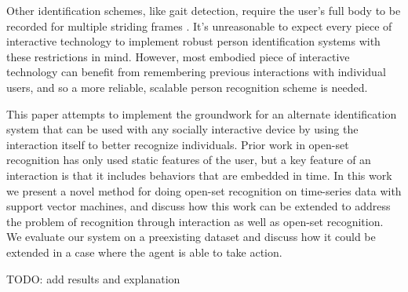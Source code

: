 \documentclass[conference]{IEEEtran}
\newcommand{\elaine}[1]{{\textcolor[rgb]{0.1,0.4,0.6}{[ESS: {\it #1}]}}}
\begin{document}
Other identification schemes, like gait detection, require the user's full body to be recorded for multiple striding frames \cite{liang_wang_silhouette_2003}\cite{han_individual_2006}. It's unreasonable to expect every piece of interactive technology to implement robust person identification systems with these restrictions in mind. However, most embodied piece of interactive technology can benefit from remembering previous interactions with individual users, and so a more reliable, scalable person recognition scheme is needed. 

This paper attempts to implement the groundwork for an alternate identification system that can be used with any socially interactive device by using the interaction itself to better recognize individuals. Prior work in open-set recognition has only used static features of the user, but a key feature of an interaction is that it includes behaviors that are embedded in time. In this work we present a novel method for doing open-set recognition on time-series data with support vector machines, and discuss how this work can be extended to address the problem of recognition through interaction as well as open-set recognition. We evaluate our system on a preexisting dataset and discuss how it could be extended in a case where the agent is able to take action. 

TODO: add results and explanation




\end{document}
